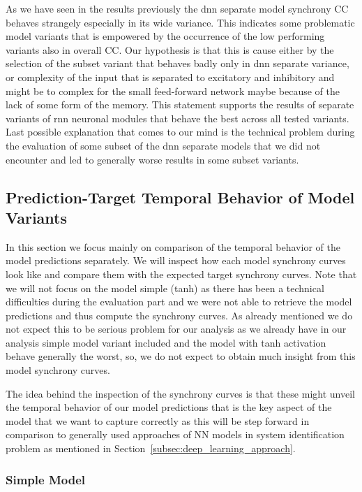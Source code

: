 As we have seen in the results previously the dnn separate model synchrony CC behaves strangely especially in its wide variance. This indicates some problematic model variants that is empowered by the occurrence of the low performing variants also in overall CC. Our hypothesis is that this is cause either by the selection of the subset variant that behaves badly only in dnn separate variance, or complexity of the input that is separated to excitatory and inhibitory and might be to complex for the small feed-forward network maybe because of the lack of some form of the memory. This statement supports the results of separate variants of rnn neuronal modules that behave the best across all tested variants. Last possible explanation that comes to our mind is the technical problem during the evaluation of some subset of the dnn separate models that we did not encounter and led to generally worse results in some subset variants.

\subsection{Prediction-Target Temporal Behavior of Model Variants}
\label{subsec:prediction_target_comparison_variants}
In this section we focus mainly on comparison of the temporal behavior of the model predictions separately. We will inspect how each model synchrony curves look like and compare them with the expected target synchrony curves. Note that we will not focus on the model simple (tanh) as there has been a technical difficulties during the evaluation part and we were not able to retrieve the model predictions and thus compute the synchrony curves. As already mentioned we do not expect this to be serious problem for our analysis as we already have in our analysis simple model variant included and the model with tanh activation behave generally the worst, so, we do not expect to obtain much insight from this model synchrony curves.

The idea behind the inspection of the synchrony curves is that these might unveil the temporal behavior of our model predictions that is the key aspect of the model that we want to capture correctly as this will be step forward in comparison to generally used approaches of NN models in system identification problem as mentioned in Section~\ref{subsec:deep_learning_approach}.

\subsubsection{Simple Model}
\label{{subsubsec:simpl_leakytanh_eval}}

